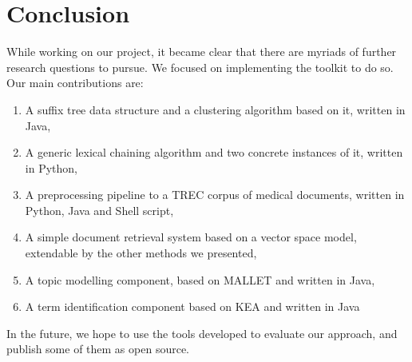 \documentclass[11pt, a4paper, abstraction]{scrartcl}
\begin{document}
\section{Conclusion}
\label{sec:conclusion}

While working on our project, it became clear that there are myriads of further research questions to pursue. We focused on implementing the toolkit to do so. Our main contributions are:

\begin{enumerate}
  \item A suffix tree data structure and a clustering algorithm based on it, written in Java,
  \item A generic lexical chaining algorithm and two concrete instances of it, written in Python,
  \item A preprocessing pipeline to a TREC corpus of medical documents, written in Python, Java and Shell script,
  \item A simple document retrieval system based on a vector space model, extendable by the other methods we presented,
  \item A topic modelling component, based on MALLET and written in Java,
  \item A term identification component based on KEA and written in Java   
\end{enumerate} 

In the future, we hope to use the tools developed to evaluate our approach, and publish some of them as open source.
\end{document}
